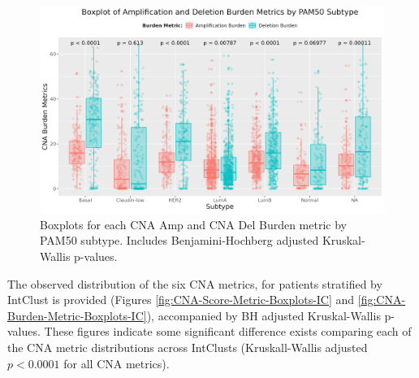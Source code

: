 \begin{figure}[!ht]
\center
\includegraphics[width=1\textwidth]{../figures/Chapter_2/Global_CNA_Burden_AmpDel_Across_PAM50.png}
\caption[Boxplots for each CNA Amp and CNA Del Burden metric by PAM50 subtype.]{Boxplots for each CNA Amp and CNA Del Burden metric by PAM50 subtype. Includes Benjamini-Hochberg adjusted Kruskal-Wallis p-values.}
\label{fig:CNA-Burden-Metric-Boxplots-P50-AmpDel}
\end{figure}
\clearpage 

The observed distribution of the six CNA metrics, for patients stratified by IntClust is provided (Figures \ref{fig:CNA-Score-Metric-Boxplots-IC} and \ref{fig:CNA-Burden-Metric-Boxplots-IC}), accompanied by BH adjusted Kruskal-Wallis p-values. These figures indicate some significant difference exists comparing each of the CNA metric distributions across IntClusts (Kruskall-Wallis adjusted $p<0.0001$ for all CNA metrics).


